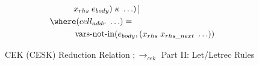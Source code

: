 \begin{figure}[!h]
{\begin{minipage}{\textwidth}
\begin{align*}
                & \hspace{1cm} x_{rhs}\;e_{body})\;\kappa\;\ldots)\,] \\
        & \where (cell_{addr}\;\ldots)=\\
                & \hspace{1cm} \operatorname{vars-not-in}(e_{body},(x_{rhs}\;x_{rhs\_next}\;\ldots))\\
      \end{align*}
    \end{minipage}%
  }
  \vspace{0.6em}
  \caption{CEK (CESK) Reduction Relation $;\longrightarrow_{\textit{cek}}$ Part II: Let/Letrec Rules}
  \label{fig:cek-reduction-relation-redacted-letrec}
\end{figure}
